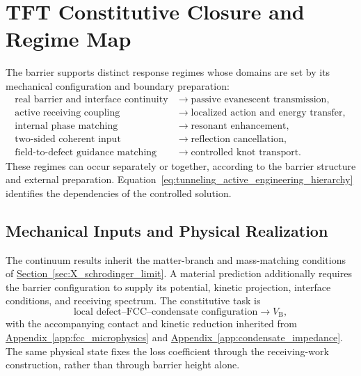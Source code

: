 \section{TFT Constitutive Closure and Regime Map}
\label{sec:tunneling_constitutive_closure}

The barrier supports distinct response regimes whose domains are set by its mechanical configuration and boundary preparation:
\begin{equation}
    \begin{aligned}
    \text{real barrier and interface continuity}
        &\longrightarrow\text{passive evanescent transmission},\\
    \text{active receiving coupling}
        &\longrightarrow\text{localized action and energy transfer},\\
    \text{internal phase matching}
        &\longrightarrow\text{resonant enhancement},\\
    \text{two-sided coherent input}
        &\longrightarrow\text{reflection cancellation},\\
    \text{field-to-defect guidance matching}
        &\longrightarrow\text{controlled knot transport}.
    \end{aligned}
    \label{eq:tunneling_regime_hierarchy}
\end{equation}
These regimes can occur separately or together, according to the barrier structure and external preparation. Equation~\eqref{eq:tunneling_active_engineering_hierarchy} identifies the dependencies of the controlled solution.

\subsection{Mechanical Inputs and Physical Realization}

The continuum results inherit the matter-branch and mass-matching conditions of \hyperref[sec:X_schrodinger_limit]{Section~\ref*{sec:X_schrodinger_limit}}. A material prediction additionally requires the barrier configuration to supply its potential, kinetic projection, interface conditions, and receiving spectrum. The constitutive task is
\begin{equation}
    \text{local defect--FCC--condensate configuration}
    \longrightarrow V_{\mathrm B},
    \label{eq:tunneling_barrier_microphysical_bridge}
\end{equation}
with the accompanying contact and kinetic reduction inherited from \hyperref[app:fcc_microphysics]{Appendix~\ref*{app:fcc_microphysics}} and \hyperref[app:condensate_impedance]{Appendix~\ref*{app:condensate_impedance}}. The same physical state fixes the loss coefficient through the receiving-work construction, rather than through barrier height alone.

